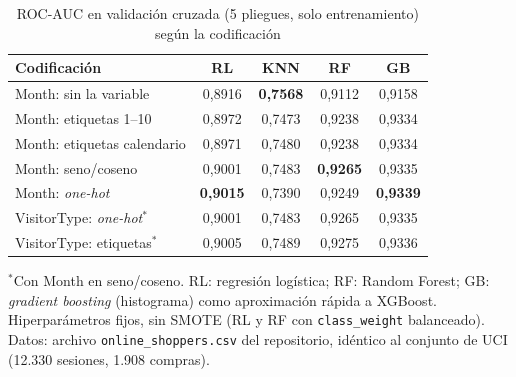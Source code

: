 \documentclass[conference]{IEEEtran}
\begin{document}
\begin{table}[!t]
\centering
\caption{ROC-AUC en validación cruzada (5 pliegues, solo entrenamiento) según la codificación}
\label{tab:cod}
\footnotesize
\setlength{\tabcolsep}{3pt}
\begin{tabular}{@{}p{3.1cm}cccc@{}}
\toprule
Codificación & RL & KNN & RF & GB \\
\midrule
Month: sin la variable      & 0,8916 & \textbf{0,7568} & 0,9112 & 0,9158 \\
Month: etiquetas 1--10      & 0,8972 & 0,7473 & 0,9238 & 0,9334 \\
Month: etiquetas calendario & 0,8971 & 0,7480 & 0,9238 & 0,9334 \\
Month: seno/coseno          & 0,9001 & 0,7483 & \textbf{0,9265} & 0,9335 \\
Month: \emph{one-hot}       & \textbf{0,9015} & 0,7390 & 0,9249 & \textbf{0,9339} \\
\midrule
VisitorType: \emph{one-hot}$^{*}$ & 0,9001 & 0,7483 & 0,9265 & 0,9335 \\
VisitorType: etiquetas$^{*}$ & 0,9005 & 0,7489 & 0,9275 & 0,9336 \\
\bottomrule
\end{tabular}

\vspace{1mm}
{\footnotesize $^{*}$Con Month en seno/coseno. RL: regresión logística; RF: Random Forest; GB: \emph{gradient boosting} (histograma) como aproximación rápida a XGBoost. Hiperparámetros fijos, sin SMOTE (RL y RF con \texttt{class\_weight} balanceado). Datos: archivo \texttt{online\_shoppers.csv} del repositorio, idéntico al conjunto de UCI (12.330 sesiones, 1.908 compras).}
\end{table}
\end{document}
